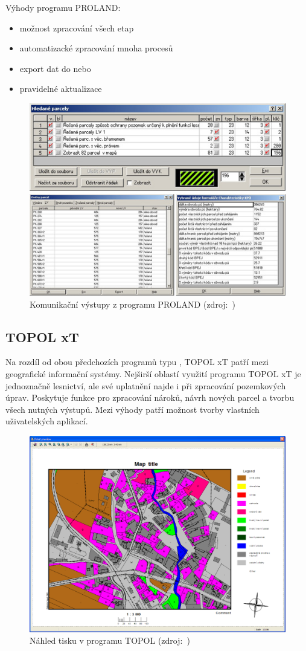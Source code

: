 Výhody programu PROLAND:
	\begin{itemize}[leftmargin=1.5cm]
		\item možnost zpracování všech etap 
		\item automatizacké zpracování mnoha procesů 
		\item export dat do  nebo~
		\item pravidelné aktualizace
	\end{itemize}

	\begin{figure}[H]
		\centering
		\includegraphics[width=.8\textwidth]{./pictures/proland.png}
		\caption[Komunikační výstupy z programu PROLAND]{Komunikační výstupy z programu PROLAND (zdroj:~\citep{proland_obrazek})}
		\label{fig:proland_obrazek}
 	\end{figure}

\subsection{TOPOL xT}
\label{topol_xt}

Na rozdíl od obou předchozích programů typu , TOPOL xT \citep{topol} patří mezi geografické informační systémy. Nejširší oblastí využití programu TOPOL xT je jednoznačně lesnictví, ale své uplatnění najde i při zpracování pozemkových úprav. Poskytuje funkce pro zpracování nároků, návrh nových parcel a tvorbu všech nutných výstupů. Mezi výhody patří možnost tvorby vlastních uživatelských aplikací.

	\begin{figure}[H]
		\centering
		\includegraphics[width=.8\textwidth]{./pictures/topol.png}
		\caption[Náhled tisku v programu TOPOL]{Náhled tisku v programu TOPOL (zdroj:~\citep{topol})}
		\label{fig:topol_obrazek}
 	\end{figure}